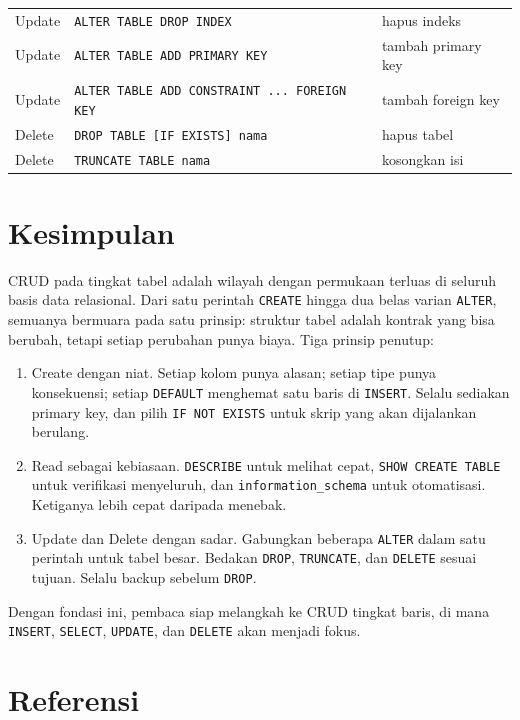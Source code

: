 \documentclass[11pt,a4paper]{article}
\begin{document}
\begin{table}[H]
\begin{tabularx}{\textwidth}{l l X}
		Update  & \texttt{ALTER TABLE DROP INDEX}                     & hapus indeks            \\
		Update  & \texttt{ALTER TABLE ADD PRIMARY KEY}                & tambah primary key      \\
		Update  & \texttt{ALTER TABLE ADD CONSTRAINT ... FOREIGN KEY} & tambah foreign key      \\
		Delete  & \texttt{DROP TABLE [IF EXISTS] nama}                & hapus tabel             \\
		Delete  & \texttt{TRUNCATE TABLE nama}                        & kosongkan isi           \\
		\bottomrule
	\end{tabularx}
\end{table}

\section{Kesimpulan}

CRUD pada tingkat tabel adalah wilayah dengan permukaan terluas di seluruh basis data relasional. Dari satu perintah \texttt{CREATE} hingga dua belas varian \texttt{ALTER}, semuanya bermuara pada satu prinsip: struktur tabel adalah kontrak yang bisa berubah, tetapi setiap perubahan punya biaya. Tiga prinsip penutup:

\begin{enumerate}
	\item Create dengan niat. Setiap kolom punya alasan; setiap tipe punya konsekuensi; setiap \texttt{DEFAULT} menghemat satu baris di \texttt{INSERT}. Selalu sediakan primary key, dan pilih \texttt{IF NOT EXISTS} untuk skrip yang akan dijalankan berulang.
	\item Read sebagai kebiasaan. \texttt{DESCRIBE} untuk melihat cepat, \texttt{SHOW CREATE TABLE} untuk verifikasi menyeluruh, dan \texttt{information\_schema} untuk otomatisasi. Ketiganya lebih cepat daripada menebak.
	\item Update dan Delete dengan sadar. Gabungkan beberapa \texttt{ALTER} dalam satu perintah untuk tabel besar. Bedakan \texttt{DROP}, \texttt{TRUNCATE}, dan \texttt{DELETE} sesuai tujuan. Selalu backup sebelum \texttt{DROP}.
\end{enumerate}

Dengan fondasi ini, pembaca siap melangkah ke CRUD tingkat baris, di mana \texttt{INSERT}, \texttt{SELECT}, \texttt{UPDATE}, dan \texttt{DELETE} akan menjadi fokus.

\newpage
\section*{Referensi}
\end{document}
